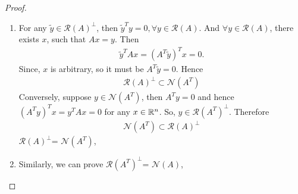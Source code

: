 \documentclass[12pt]  {article}%
\begin{document}
\begin{proof}%
\begin{enumerate}
\item  For any $\tilde{y}\in\mathcal{R}(A)^\bot$, then $\tilde{y}^T y=0, \forall y\in\mathcal{R}(A)$. And $\forall y \in\mathcal{R}(A)$, there exists $x$, such that $Ax=y$.
Then
\begin{eqnarray*}
\tilde {y}^T Ax=(A^T\tilde y)^Tx=0.
\end{eqnarray*}
Since, $x$ is arbitrary, so it must be $A^T\tilde y=0$. Hence
\begin{eqnarray*}
\mathcal{R}(A)^\bot\subset\mathcal{N}(A^T)
\end{eqnarray*}
Conversely, suppose $y\in \mathcal{N}(A^T)$, then $A^Ty=0$ and hence $(A^Ty)^Tx=y^TAx=0$ for any $x\in\mathbb{R}^n$. So, $y\in \mathcal{R}(A^T)^\bot$. Therefore
\begin{eqnarray*}
\mathcal{N}(A^T)\subset\mathcal{R}(A)^\bot
\end{eqnarray*}
$\mathcal{R}(A)^\bot$= $\mathcal{N}(A^T)$,
\item Similarly, we can prove $\mathcal{R}(A^T)^\bot$= $\mathcal{N}(A)$,
\end{enumerate}
\end{proof}


\end{document}
